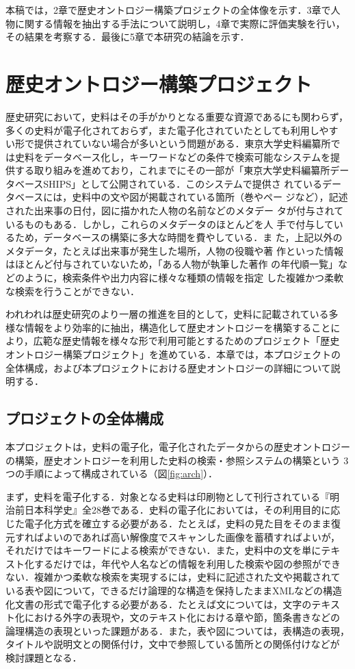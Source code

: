 \documentclass[japanese]{jnlp_1.4}
\begin{document}
本稿では，2章で歴史オントロジー構築プロジェクトの全体像を示す．3章で人
物に関する情報を抽出する手法について説明し，4章で実際に評価実験を行い，
その結果を考察する．最後に5章で本研究の結論を示す．


\section{歴史オントロジー構築プロジェクト}

歴史研究において，史料はその手がかりとなる重要な資源であるにも関わらず，
多くの史料が電子化されておらず，また電子化されていたとしても利用しやす
い形で提供されていない場合が多いという問題がある．東京大学史料編纂所で
は史料をデータベース化し，キーワードなどの条件で検索可能なシステムを提
供する取り組みを進めており，これまでにその一部が「東京大学史料編纂所デー
タベースSHIPS」\cite{ships}として公開されている．このシステムで提供さ
れているデータベースには，史料中の文や図が掲載されている箇所（巻やペー
ジなど），記述された出来事の日付，図に描かれた人物の名前などのメタデー
タが付与されているものもある．しかし，これらのメタデータのほとんどを人
手で付与しているため，データベースの構築に多大な時間を費やしている．ま
た，上記以外のメタデータ，たとえば出来事が発生した場所，人物の役職や著
作といった情報はほとんど付与されていないため，「ある人物が執筆した著作
の年代順一覧」などのように，検索条件や出力内容に様々な種類の情報を指定
した複雑かつ柔軟な検索を行うことができない．

われわれは歴史研究のより一層の推進を目的として，史料に記載されている多
様な情報をより効率的に抽出，構造化して歴史オントロジーを構築することに
より，広範な歴史情報を様々な形で利用可能とするためのプロジェクト「歴史
オントロジー構築プロジェクト」を進めている．本章では，本プロジェクトの
全体構成，および本プロジェクトにおける歴史オントロジーの詳細について説
明する．



\subsection{プロジェクトの全体構成}

本プロジェクトは，史料の電子化，電子化されたデータからの歴史オントロジー
の構築，歴史オントロジーを利用した史料の検索・参照システムの構築という
3つの手順によって構成されている（図\ref{fig:arch}）．

まず，史料を電子化する．対象となる史料は印刷物として刊行されている『明
治前日本科学史』全28巻である．史料の電子化においては，その利用目的に応
じた電子化方式を確立する必要がある．たとえば，史料の見た目をそのまま復
元すればよいのであれば高い解像度でスキャンした画像を蓄積すればよいが，
それだけではキーワードによる検索ができない．また，史料中の文を単にテキ
スト化するだけでは，年代や人名などの情報を利用した検索や図の参照ができ
ない．複雑かつ柔軟な検索を実現するには，史料に記述された文や掲載されて
いる表や図について，できるだけ論理的な構造を保持したままXMLなどの構造
化文書の形式で電子化する必要がある．たとえば文については，文字のテキス
ト化における外字の表現や，文のテキスト化における章や節，箇条書きなどの
論理構造の表現といった課題がある．また，表や図については，表構造の表現，
タイトルや説明文との関係付け，文中で参照している箇所との関係付けなどが
検討課題となる．
\end{document}
